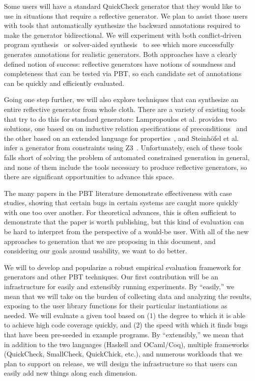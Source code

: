 Some users will have a standard QuickCheck generator that they would like to use
in situations that require a reflective generator. We plan to assist those
users with tools that automatically synthesize the backward annotations
required to make the generator bidirectional. We will experiment with both
conflict-driven program synthesis~\cite{feng_program_2018} or solver-aided
synthesis~\cite{torlak_growing_2013} to see which more successfully generates
annotations for realistic generators. Both approaches have a clearly defined
notion of success: reflective generators have notions of soundness and
completeness that can be tested via PBT, so each candidate set of annotations
can be quickly and efficiently evaluated.

Going one step further, we will also explore techniques that can synthesize an
entire reflective generator from whole cloth. There are a variety of existing
tools that try to do this for standard generators: Lampropoulos et al. provides
two solutions, one based on on inductive relation specifications of
preconditions~\cite{lampropoulos2017generating} and the other based on an
extended language for properties~\cite{beginners-luck}, and Steinh\"ofel et al.
infer a generator from constraints using
Z3~\cite{steinhofel_input_2022,de_moura_z3_2008}. Unfortunately, each of these
tools falls short of solving the problem of automated constrained generation in
general, and none of them include the tools necessary to produce reflective
generators, so there are significant opportunities to advance this space.

%
\iflater{}\fi
\iflater{}\fi
%
The many papers in the PBT literature demonstrate effectiveness with case
studies, showing that certain bugs in certain systems are caught more quickly
with one too over another. For theoretical advances, this is often sufficient
to demonstrate that the paper is worth publishing, but this kind of evaluation
can be hard to interpret from the perspective of a would-be user. With all of
the new approaches to generation that we are proposing in this document, and
considering our goals around usability, we want to do better.

We will to develop and popularize a robust empirical evaluation framework for
generators and other PBT techniques. Our first contribution will be an
infrastructure for easily and extensibly running experiments.  By ``easily,'' we
mean that we will take on the burden of collecting data and analyzing the
results, exposing to the user library functions for their particular
instantiations as needed. We will evaluate a given tool based on (1) the degree
to which it is able to achieve high code coverage quickly, and (2) the speed
with which it finds bugs that have been pre-seeded in example programs. By
``extensibly,'' we mean that in addition to the two languages (Haskell and
OCaml/Coq), multiple frameworks (QuickCheck, SmallCheck, QuickChick, etc.), and
numerous workloads that we plan to support on release, we will design the
infrastructure so that users can easily add new things along each dimension.

